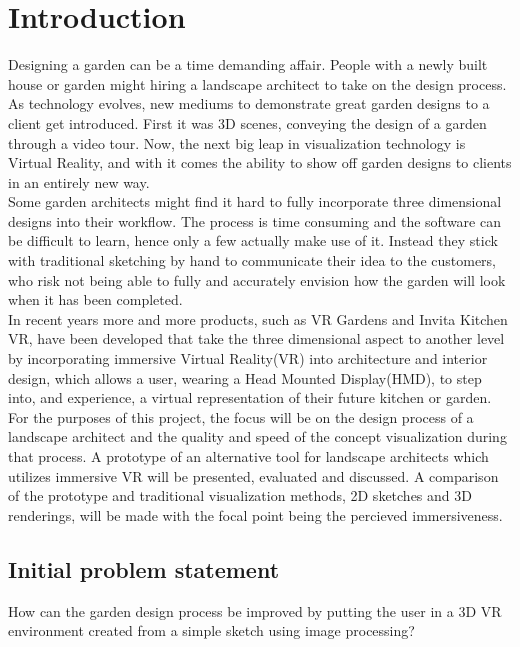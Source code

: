 \chapter{Introduction}
	Designing a garden can be a time demanding affair. People with a newly built house or garden might hiring a landscape architect to take on the design process. As technology evolves, new mediums to demonstrate great garden designs to a client get introduced\cite{landscapeArchitectureDigiTech}. First it was 3D scenes, conveying the design of a garden through a video tour. Now, the next big leap in visualization technology is Virtual Reality\cite{VRS}, and with it comes the ability to show off garden designs to clients in an entirely new way.\\
	
	Some garden architects might find it hard to fully incorporate three dimensional designs into their workflow. The process is time consuming and the software can be difficult to learn, hence only a few actually make use of it. Instead they stick with traditional sketching by hand to communicate their idea to the customers, who risk not being able to fully and accurately envision how the garden will look when it has been completed.\\
	
	In recent years more and more products, such as VR Gardens and Invita Kitchen VR, have been developed that take the three dimensional aspect to another level by incorporating immersive Virtual Reality(VR) into architecture and interior design, which allows a user, wearing a Head Mounted Display(HMD), to step into, and experience, a virtual representation of their future kitchen or garden.\\
	
	For the purposes of this project, the focus will be on the design process of a landscape architect and the quality and speed of the concept visualization during that process. A prototype of an alternative tool for landscape architects which utilizes immersive VR will be presented, evaluated and discussed. A comparison of the prototype and traditional visualization methods, 2D sketches and 3D renderings, will be made with the focal point being the percieved immersiveness.
	
	
	\section{Initial problem statement}
	How can the garden design process be improved by putting the user in a 3D VR environment created from a simple sketch using image processing?
	